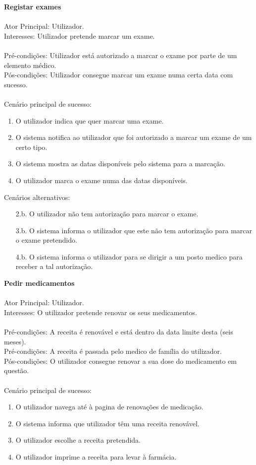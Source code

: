\documentclass[12pt, a4paper, twoside]{report} %
\begin{document}
\noindent\textbf{Registar exames}
\\
\\
Ator Principal: Utilizador.\\
Interesses: Utilizador pretende marcar um exame.\\
\\
Pré-condições: Utilizador está autorizado a marcar o exame por parte de um elemento médico.\\
Pós-condições: Utilizador consegue marcar um exame numa certa data com sucesso.\\
\\
Cenário principal de sucesso: 
	\begin{enumerate}
	\item O utilizador indica que quer marcar uma exame.
	\item O sistema notifica ao utilizador que foi autorizado a marcar um exame de um certo tipo.
	\item O sistema mostra as datas disponíveis pelo sistema para a marcação.
	\item O utilizador marca o exame numa das datas disponíveis.
	\end{enumerate}

\noindent Cenários alternativos:
	\begin{enumerate}
	\item [2.b.] O utilizador não tem autorização para marcar o exame.
	\item [3.b.] O sistema informa o utilizador que este não tem autorização para marcar o exame pretendido.
	\item [4.b.] O sistema informa o utilizador para se dirigir a um posto medico para receber a tal autorização.
	\end{enumerate}

\noindent\textbf{Pedir medicamentos}
\\
\\
Ator Principal: Utilizador.\\
Interesses: O utilizador pretende renovar os seus medicamentos.\\
\\
Pré-condições: A receita é renovável e está dentro da data limite desta (seis meses).\\
Pré-condições: A receita é passada pelo medico de família do utilizador.\\
Pós-condições: O utilizador consegue renovar a sua dose do medicamento em questão.\\
\\
Cenário principal de sucesso:
	\begin{enumerate}
	\item O utilizador navega até à pagina de renovações de medicação.
	\item O sistema informa que utilizador têm uma receita renovável.
	\item O utilizador escolhe a receita pretendida.
	\item O utilizador imprime a receita para levar à farmácia.
	\end{enumerate}
\end{document}
